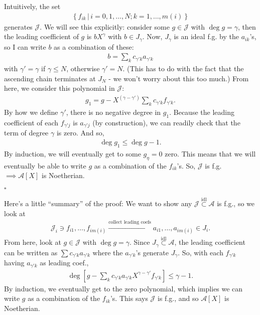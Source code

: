 \documentclass[12pt]{article}
\newcommand{\lb}{\left[}
\newcommand{\rb}{\right]}
\newcommand{\lc}{\left\{}
\newcommand{\rc}{\right\}}
\begin{document}
	\noindent Intuitively, the set 
	\begin{align*}
	\lc f_{ik} \,\vert\, i = 0,1,\dots,N; k = 1,\dots,m(i) \rc
	\end{align*} 
	generates $\mathcal{J}$. We will see this explicitly: consider some ${g} \in \mathcal{J}$ with $\deg {g} = \gamma$, then the leading coefficient of ${g}$ is $bX^\gamma$ with $b\in J_\gamma$. Now, $J_\gamma$ is an ideal f.g. by the $a_{ik}$'s, so I can write $b$ as a combination of these:
	\begin{align*}
	b = \sum_{k}c_{\gamma'k}a_{\gamma'k}
	\end{align*}
	with $\gamma' = \gamma$ if $\gamma \leq N$, otherwise $\gamma' = N$. (This has to do with the fact that the ascending chain terminates at $J_N$ - we won't worry about this too much.) From here, we consider this polynomial in $\mathcal{J}$:
	\begin{align*}
	g_1 = g - X^{(\gamma-\gamma')}\sum_k c_{\gamma'k}f_{\gamma'k}.
	\end{align*}    
	By how we define $\gamma'$, there is no negative degree in $g_1$. Because the leading coefficient of each $f_{\gamma'j}$ is $a_{\gamma'j}$ (by construction), we can readily check that the term of degree $\gamma$ is zero. And so,
	\begin{align*}
	\deg g_1 \leq \deg g - 1.
	\end{align*}
	By induction, we will eventually get to some $g_\eta = 0$ zero. This means that we will eventually be able to write $g$ as a combination of the $f_{ik}$'s. So, $\mathcal{J}$ is f.g. $\implies \mathcal{A}[X]$ is Noetherian.
 


\hfill$\square$

\noindent \hrulefill

Here's a little ``summary'' of the proof: We want to show any $\mathcal{J} \overset{\text{idl}}{\subset} \mathcal{A}$ is f.g., so we look at
\begin{align*}
\mathcal{J}_i \ni f_{i1}, \dots, f_{im(i)} \xrightarrow{\text{collect leading coefs}} a_{i1},\dots,a_{im(i)} \in J_i.
\end{align*}
From here, look at $g\in \mathcal{J}$ with $\deg g = \gamma$. Since ${J}_\gamma \overset{\text{idl}}{\subset} \mathcal{A}$, the leading coefficient can be written as $\sum c_{\gamma'k}a_{\gamma'k}$ where the $a_{\gamma'k}$'s generate $J_\gamma$. So, with each $f_{\gamma'k}$ having $a_{\gamma'k}$ as leading coef.,
\begin{align*}
\deg\lb g - \sum_{k}c_{\gamma'k}a_{\gamma'k} X^{\gamma-\gamma'}f_{\gamma'k}\rb \leq \gamma-1.
\end{align*}
By induction, we eventually get to the zero polynomial, which implies we can write $g$ as a combination of the $f_{ik}$'s. This says $\mathcal{J}$ is f.g., and so $\mathcal{A}[X]$ is Noetherian.
\end{document}
